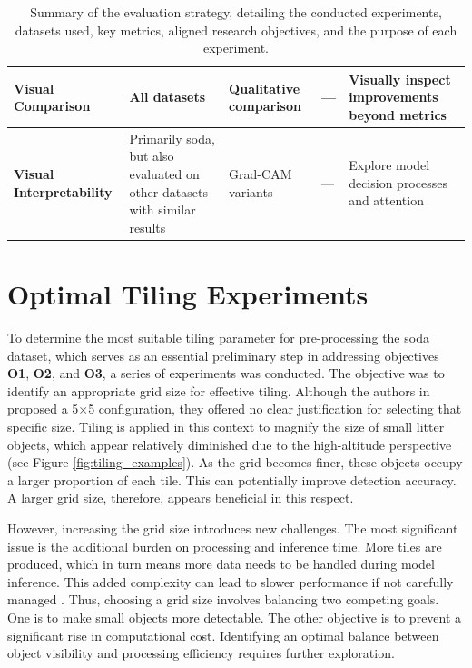 \begin{table}[htbp]
\begin{adjustbox}{max width=\textwidth}
\begin{tabular}{|l|P{3.5cm}|P{3.5cm}|P{2.5cm}|P{5cm}|}
        \textbf{Visual Comparison} & All datasets & Qualitative comparison & — & Visually inspect improvements beyond metrics \\ \hline
        \textbf{Visual Interpretability} & Primarily \gls{soda}, but also evaluated on other datasets with similar results & Grad-CAM variants & — & Explore model decision processes and attention \\
        \hline
    \end{tabular}
    \end{adjustbox}
    \caption{Summary of the evaluation strategy, detailing the conducted experiments, datasets used, key metrics, aligned research objectives, and the purpose of each experiment.}
    \label{tab:experiment_strategy}
\end{table}


\section{Optimal Tiling Experiments}
\label{sec:5_tiling_exp}

To determine the most suitable tiling parameter for pre-processing the \gls{soda} dataset, which serves as an essential preliminary step in addressing objectives \textbf{O1}, \textbf{O2}, and \textbf{O3}, a series of experiments was conducted. The objective was to identify an appropriate grid size for effective tiling. Although the authors in \cite{detect_litter} proposed a 5$\times$5 configuration, they offered no clear justification for selecting that specific size.
Tiling is applied in this context to magnify the size of small litter objects, which appear relatively diminished due to the high-altitude perspective (see Figure \ref{fig:tiling_examples}). As the grid becomes finer, these objects occupy a larger proportion of each tile. This can potentially improve detection accuracy. A larger grid size, therefore, appears beneficial in this respect.

However, increasing the grid size introduces new challenges. The most significant issue is the additional burden on processing and inference time. More tiles are produced, which in turn means more data needs to be handled during model inference. This added complexity can lead to slower performance if not carefully managed \cite{tiling}.
Thus, choosing a grid size involves balancing two competing goals. One is to make small objects more detectable. The other objective is to prevent a significant rise in computational cost. Identifying an optimal balance between object visibility and processing efficiency requires further exploration.

